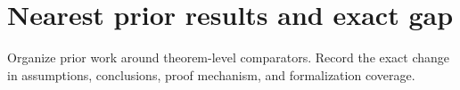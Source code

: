 \section{Nearest prior results and exact gap}
Organize prior work around theorem-level comparators. Record the exact change in assumptions, conclusions, proof mechanism, and formalization coverage.
